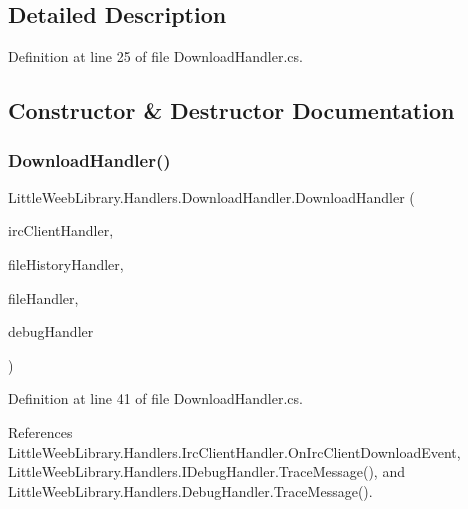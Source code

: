\subsection{Detailed Description}


Definition at line 25 of file Download\+Handler.\+cs.



\subsection{Constructor \& Destructor Documentation}
\mbox{\label{class_little_weeb_library_1_1_handlers_1_1_download_handler_ae98f5b136d09bb9f619bfad68f8d8bf7}} 
\subsubsection{\texorpdfstring{Download\+Handler()}{DownloadHandler()}}
{\footnotesize\ttfamily Little\+Weeb\+Library.\+Handlers.\+Download\+Handler.\+Download\+Handler (\begin{DoxyParamCaption}\item[{\mbox{\hyperlink{interface_little_weeb_library_1_1_handlers_1_1_i_irc_client_handler}{I\+Irc\+Client\+Handler}}}]{irc\+Client\+Handler,  }\item[{\mbox{\hyperlink{interface_little_weeb_library_1_1_handlers_1_1_i_file_history_handler}{I\+File\+History\+Handler}}}]{file\+History\+Handler,  }\item[{\mbox{\hyperlink{interface_little_weeb_library_1_1_handlers_1_1_i_file_handler}{I\+File\+Handler}}}]{file\+Handler,  }\item[{\mbox{\hyperlink{interface_little_weeb_library_1_1_handlers_1_1_i_debug_handler}{I\+Debug\+Handler}}}]{debug\+Handler }\end{DoxyParamCaption})}



Definition at line 41 of file Download\+Handler.\+cs.



References Little\+Weeb\+Library.\+Handlers.\+Irc\+Client\+Handler.\+On\+Irc\+Client\+Download\+Event, Little\+Weeb\+Library.\+Handlers.\+I\+Debug\+Handler.\+Trace\+Message(), and Little\+Weeb\+Library.\+Handlers.\+Debug\+Handler.\+Trace\+Message().


